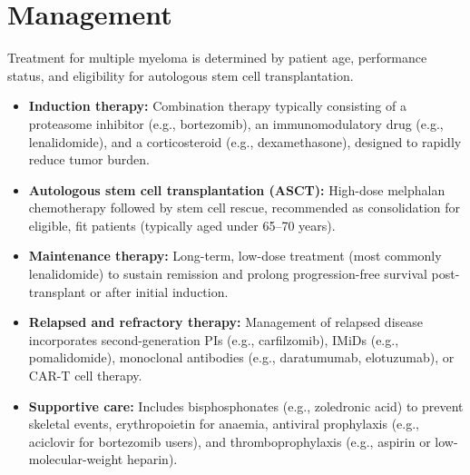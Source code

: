 \section*{Management}
Treatment for multiple myeloma is determined by patient age, performance status, and eligibility for autologous stem cell transplantation.
\begin{itemize}
    \item \textbf{Induction therapy:} Combination therapy typically consisting of a proteasome inhibitor (e.g., bortezomib), an immunomodulatory drug (e.g., lenalidomide), and a corticosteroid (e.g., dexamethasone), designed to rapidly reduce tumor burden.
    \item \textbf{Autologous stem cell transplantation (ASCT):} High-dose melphalan chemotherapy followed by stem cell rescue, recommended as consolidation for eligible, fit patients (typically aged under 65--70 years).
    \item \textbf{Maintenance therapy:} Long-term, low-dose treatment (most commonly lenalidomide) to sustain remission and prolong progression-free survival post-transplant or after initial induction.
    \item \textbf{Relapsed and refractory therapy:} Management of relapsed disease incorporates second-generation PIs (e.g., carfilzomib), IMiDs (e.g., pomalidomide), monoclonal antibodies (e.g., daratumumab, elotuzumab), or CAR-T cell therapy.
    \item \textbf{Supportive care:} Includes bisphosphonates (e.g., zoledronic acid) to prevent skeletal events, erythropoietin for anaemia, antiviral prophylaxis (e.g., aciclovir for bortezomib users), and thromboprophylaxis (e.g., aspirin or low-molecular-weight heparin).
\end{itemize}

